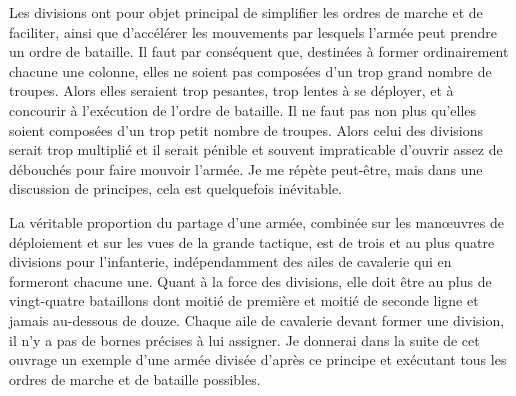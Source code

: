 \documentclass[french,twoside]{book} %
\begin{document}
Les divisions ont pour objet principal de simplifier les ordres de marche et de faciliter, ainsi que d’accélérer les mouvements par lesquels l’armée peut prendre un ordre de bataille. Il faut par conséquent que, destinées à former ordinairement chacune une colonne, elles ne soient pas composées d’un trop grand nombre de troupes. Alors elles seraient trop pesantes, trop lentes à se déployer, et à concourir à l’exécution de l’ordre de bataille. Il ne faut pas non plus qu’elles soient composées d’un trop petit nombre de troupes. Alors celui des divisions serait trop multiplié et il serait pénible et souvent impraticable d’ouvrir assez de débouchés pour faire mouvoir l’armée. Je me répète peut-être, mais dans une discussion de principes, cela est quelquefois inévitable.\par
La véritable proportion du partage d’une armée, combinée sur les manœuvres de déploiement et sur les vues de la grande tactique, est de trois et au plus quatre divisions pour l’infanterie, indépendamment des ailes de cavalerie qui en formeront chacune une. Quant à la force des divisions, elle doit être au plus de vingt-quatre bataillons dont moitié de première et moitié de seconde ligne et jamais au-dessous de douze. Chaque aile de cavalerie devant former une division, il n’y a pas de bornes précises à lui assigner. Je donnerai dans la suite de cet ouvrage un exemple d’une armée divisée d’après ce principe et exécutant tous les ordres de marche et de bataille possibles.\par
\end{document}
